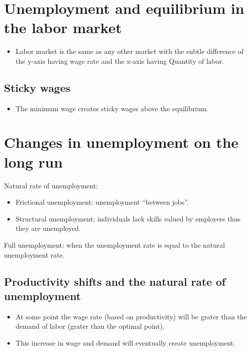 \documentclass[openany]{book}
\begin{document}
\section{Unemployment and equilibrium in the labor market}
\begin{itemize}
    \item Labor market is the same as any other market with the subtle difference of the y-axis having wage rate and the x-axis having Quantity of labor. 
\end{itemize}

\subsection{Sticky wages}
\begin{itemize}
    \item The minimum wage creates sticky wages above the equilibrium. 
\end{itemize}


\section{Changes in unemployment on the long run}
Natural rate of unemployment: 
\begin{itemize}
    \item Frictional unemployment: unemployment ``between jobs''.
    \item Structural unemployment: individuals lack skills valued by employers thus they are unemployed. 
\end{itemize}
Full unemployment: when the unemployment rate is equal to the natural unemployment rate. 

\subsection{Productivity shifts and the natural rate of unemployment}
\begin{itemize}
    \item At some point the wage rate (based on productivity) will be grater than the demand of labor (grater than the optimal point).
    \item This increase in wage and demand will eventually create unemployment. 
\end{itemize}
\end{document}
